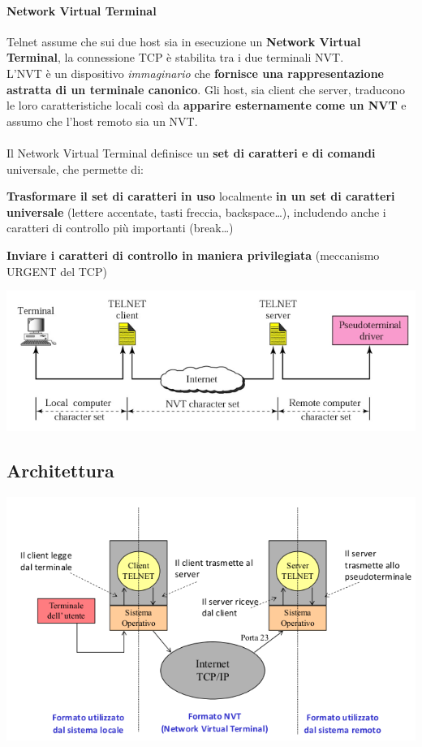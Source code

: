 \documentclass[10pt]{article}
\begin{document}
\paragraph{Network Virtual Terminal} Telnet assume che sui due host sia in esecuzione un \textbf{Network Virtual Terminal}, la connessione TCP è stabilita tra i due terminali NVT.\\
L'NVT è un dispositivo \textit{immaginario} che \textbf{fornisce una rappresentazione astratta di un terminale canonico}. Gli host, sia client che server, traducono le loro caratteristiche locali così da \textbf{apparire esternamente come un NVT} e assumo che l'host remoto sia un NVT.\\\\
Il Network Virtual Terminal definisce un \textbf{set di caratteri e di comandi} universale, che permette di:
\begin{list}{}{}
\item \textbf{Trasformare il set di caratteri in uso} localmente \textbf{in un set di caratteri universale} (lettere accentate, tasti freccia, backspace\ldots), includendo anche i caratteri di controllo più importanti (break\ldots)
\item \textbf{Inviare i caratteri di controllo in maniera privilegiata} (meccanismo URGENT del TCP)
\end{list}
\includegraphics[scale=0.75]{NVT.png}\\
\subsection{Architettura}
\includegraphics[scale=0.75]{telnetarch.png}
\end{document}
